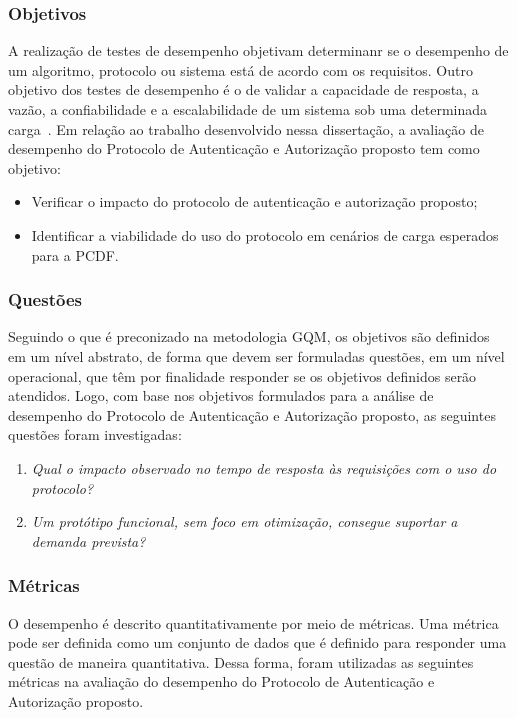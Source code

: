 \subsubsection{Objetivos }\label{sec:gqmobjetivos}

A realização de testes de desempenho objetivam determinanr se o desempenho de um algoritmo, protocolo ou sistema está de acordo com os requisitos. Outro objetivo dos testes de desempenho é o de validar a capacidade de resposta, a vazão, a confiabilidade e a escalabilidade de um sistema sob uma determinada carga~\cite{Meier2007}. Em relação ao trabalho desenvolvido nessa dissertação, a avaliação de desempenho do Protocolo de Autenticação e Autorização proposto tem como objetivo:

\begin{itemize}
\item Verificar o impacto do protocolo de autenticação e autorização proposto;
\item Identificar a viabilidade do uso do protocolo em cen\'{a}rios de carga esperados para a PCDF.
\end{itemize}


\subsubsection{Questões}\label{sec:gqmquestoes}

Seguindo o que é preconizado na metodologia GQM, os objetivos são definidos em um nível abstrato, de forma que devem ser formuladas questões, em um nível operacional, que têm por finalidade responder se os objetivos definidos serão atendidos. Logo, com base nos objetivos formulados para a análise de desempenho do Protocolo de Autenticação e Autorização proposto, as seguintes questões foram investigadas:

\parbox{0.8\textwidth}{
\begin{enumerate}[(Q1)]
\item \emph{Qual o impacto observado no tempo de resposta às requisições com o uso do protocolo?}
\item \emph{Um protótipo funcional, sem foco em otimização, consegue suportar a demanda prevista?}
\end{enumerate}}

\subsubsection{Métricas}

O desempenho é descrito quantitativamente por meio de métricas. Uma métrica pode ser definida como um conjunto de dados que é definido para responder uma questão de maneira quantitativa. Dessa forma, foram utilizadas as seguintes métricas na avaliação do desempenho do Protocolo de Autenticação e Autorização proposto.

